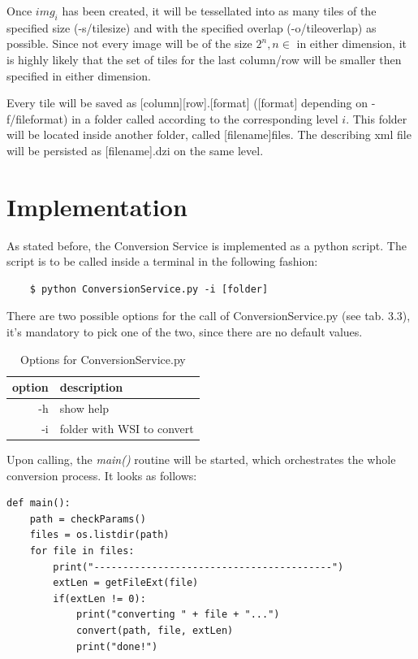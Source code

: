 Once $img_i$ has been created, it will be tessellated into as many tiles of the specified size (-s/tile{\textunderscore}size) and with the specified overlap (-o/tile{\textunderscore}overlap) as possible. Since not every image will be of the size $2^n, n \in $ in either dimension, it is highly likely that the set of tiles for the last column/row will be smaller then specified in either dimension.

Every tile will be saved as [column]{\textunderscore}[row].[format] ([format] depending on -f/file{\textunderscore}format) in a folder called according to the corresponding level $i$. This folder will be located inside another folder, called [filename]{\textunderscore}files. The describing xml file will be persisted as [filename].dzi on the same level.


\section{Implementation}

As stated before, the Conversion Service is implemented as a python script. The script is to be called inside a terminal in the following fashion:

\begin{lstlisting}
	$ python ConversionService.py -i [folder]
\end{lstlisting}

There are two possible options for the call of ConversionService.py (see tab. 3.3), it's mandatory to pick one of the two, since there are no default values.

\begin{table} [h]
	\begin{center}
		\begin{tabular}{| r | l |}
			\hline
			\textbf{option} & \textbf{description} \\ \hline
			-h & show help \\ \hline
			-i & folder with WSI to convert \\ \hline
		\end{tabular}
		\caption{Options for ConversionService.py}
	\end{center}
\end{table}

Upon calling, the \emph{main()} routine will be started, which orchestrates the whole conversion process. It looks as follows:

\begin{lstlisting}[frame=single]
def main():
	path = checkParams()
	files = os.listdir(path)
	for file in files:
		print("-----------------------------------------")
		extLen = getFileExt(file)
		if(extLen != 0):
			print("converting " + file + "...")
			convert(path, file, extLen)
			print("done!")
\end{lstlisting}

